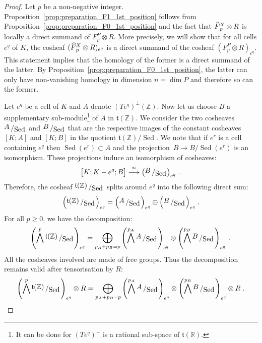 \documentclass[AHL,Unicode,longabstracts,published]{cedram}
\newcommand{\bigslant}[2]{{\raisebox{.2em}{$#1$}\left/\raisebox{-.2em}{$#2$}\right.}}
\newcommand{\R}{\mathbb{R}}
\newcommand{\Z}{\mathbb{Z}}
\renewcommand{\t}{\mathfrak{t}}
\DeclareMathOperator{\Sed}{Sed}
\newcommand{\Fbar}{\hat{F}}
\newcommand{\smallslant}[2]{{#1}/{#2}}
\let\oldhat\hat
\renewcommand*{\hat}[1]{\mathchoice{\widehat{#1}}{\widehat{#1}}{\oldhat{#1}}{\oldhat{#1}}}
\begin{document}
\begin{proof}
Let $p$ be a non-negative integer. Proposition~\ref{prop:preparation_F1_1st_position} follows from Proposition~\ref{prop:preparation_F0_1st_position} and the fact that $\Fbar_p^{X}\otimes R$ is locally a direct summand of $F_p^{P}\otimes R$. More precisely, we will show that for all cells $e^q$ of $K$, the cosheaf $(\Fbar_p^{X}\otimes R)_{e^q}$ is a direct summand of the cosheaf $(F_p^{P}\otimes R)_{e^q}$. This statement implies that the homology of the former is a direct summand of the latter. By Proposition~\ref{prop:preparation_F0_1st_position}, the latter can only have non-vanishing homology in dimension $n=\dim P$ and therefore so can the former.


Let $e^q$ be a cell of $K$ and $A$ denote $(Te^q)^\perp(\Z)$. Now let us choose $B$ a supplementary sub-module\footnote{It can be done for $(Te^q)^\perp$ is a rational sub-space of $\t(\R)$.} of $A$ in $\t(\Z)$. We consider the two cosheaves $\bigslant{A}{\Sed}$ and $\bigslant{B}{\Sed}$ that are the respective images of the constant cosheaves $[K;A]$ and $[K;B]$ in the quotient $\smallslant{\t(\Z)}{\Sed}$. We note that if $e^r$ is a cell containing $e^q$ then $\Sed(e^r)\subset A$ and the projection~$B\rightarrow \smallslant{B}{\Sed(e^r)}$ is an isomorphism. These projections induce an isomorphism of cosheaves:
\begin{equation*}
\big[K;K-e^q;B\big]\overset{\cong}{\longrightarrow} \left(\bigslant{B}{\Sed}\right)_{e^q}\;.
\end{equation*}
Therefore, the cosheaf $\bigslant{\t(\Z)}{\Sed}$ splits around $e^q$ into the following direct sum:
\begin{equation*}
\left(\bigslant{\t(\Z)}{\Sed}\right)_{e^q}=\Big(\bigslant{A}{\Sed}\Big)_{e^q}\oplus \Big(\bigslant{B}{\Sed}\Big)_{e^q}\;.
\end{equation*}
For all $p\geq0$, we have the decomposition:
\begin{equation*}
\left(\bigwedge^p\bigslant{\t(\Z)}{\Sed}\right)_{e^q}=\bigoplus_{p_A+p_B=p}\left(\bigwedge^{p_A}\bigslant{A}{\Sed}\right)_{e^q}\otimes \left(\bigwedge^{p_B}\bigslant{B}{\Sed}\right)_{e^q}\;.
\end{equation*}
All the cosheaves involved are made of free groups. Thus the decomposition remains valid after tensorisation by $R$:
\begin{equation*}
\left(\bigwedge^p\bigslant{\t(\Z)}{\Sed}\right)_{e^q}\otimes R=\bigoplus_{p_A+p_B=p}\left(\bigwedge^{p_A}\bigslant{A}{\Sed}\right)_{e^q}\otimes \left(\bigwedge^{p_B}\bigslant{B}{\Sed}\right)_{e^q}\otimes R\;.

\end{equation*}
\end{proof}
\end{document}
